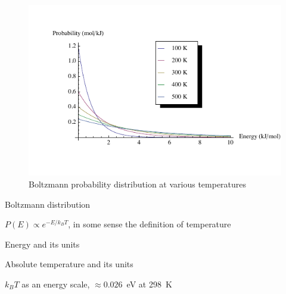 \documentclass[11pt]{article}
\begin{document}
\begin{outline}
\begin{outline}
\begin{figure}
\begin{center}
\includegraphics[scale=1.25]{Images/Boltzmann.pdf}
\caption{Boltzmann probability distribution at various temperatures}
\end{center}
\end{figure}

\item{Boltzmann distribution}
    \begin{outline}
    \item $P(E) \propto e^{-E/k_BT}$, in some sense the definition of temperature
    \item Energy and its units
    \item Absolute temperature and its units
    \item $k_BT$ as an energy scale, $\approx 0.026$~eV at 298~K


\end{outline}
\end{outline}
\end{outline}
\end{document}
